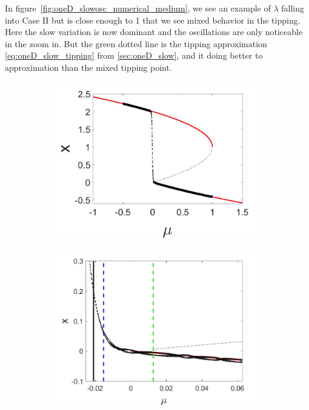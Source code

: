 In figure~\ref{fig:oneD_slowosc_numerical_medium}, we see an example of $\lambda$ falling into Case II but is close enough to 1 that we see mixed behavior in the tipping. Here the slow variation is now dominant and the oscillations are only noticeable in the zoom in. But the green dotted line is the tipping approximation \eqref{eq:oneD_slow_tipping} from \autoref{sec:oneD_slow}, and it doing better to approximation than the mixed tipping point.

\begin{figure}[H]
\centering
\begin{subfigure}{.5\textwidth}
  \centering
  \includegraphics[width=\linewidth]{oneD/slowosc_bif_diagram_medium.jpg}
  \caption{}
\end{subfigure}%
\begin{subfigure}{.5\textwidth}
  \centering
  \includegraphics[width=\linewidth]{oneD/slowosc_bif_diagram_medium_zoom.jpg}

\end{subfigure}
\end{figure}
